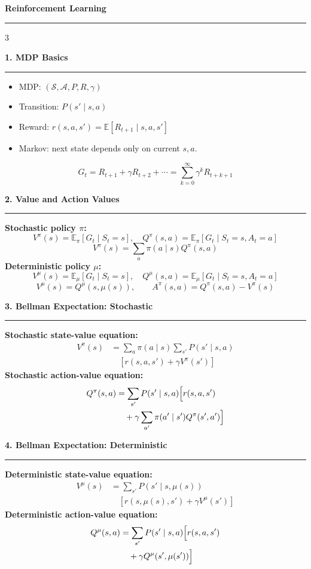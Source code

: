 \documentclass[a4paper]{article}
\newcommand{\sect}[1]{\vspace{2pt}\noindent\textbf{\large #1}\par\hrule\vspace{2pt}}
\newcommand{\tightitem}{\setlength{\itemsep}{0pt}\setlength{\parskip}{0pt}\setlength{\parsep}{0pt}}
\begin{document}
{\fontsize{26}{28}\selectfont\bfseries Reinforcement Learning}

\vspace{2mm}\hrule\vspace{3mm}

\begin{multicols*}{3}
\fontsize{9.7}{11}\selectfont

\sect{1. MDP Basics}
\begin{itemize}\tightitem
\item MDP: $(\mathcal S,\mathcal A,P,R,\gamma)$
\item Transition: $P(s'\mid s,a)$
\item Reward: $r(s,a,s')=\mathbb E[R_{t+1}\mid s,a,s']$
\item Markov: next state depends only on current $s,a$.
\end{itemize}
\[
G_t=R_{t+1}+\gamma R_{t+2}+\cdots
=\sum_{k=0}^{\infty}\gamma^kR_{t+k+1}
\]

\sect{2. Value and Action Values}
\textbf{Stochastic policy $\pi$:}
\[
V^\pi(s)=\mathbb E_\pi[G_t\mid S_t=s],\quad
Q^\pi(s,a)=\mathbb E_\pi[G_t\mid S_t=s,A_t=a]
\]
\[
V^\pi(s)=\sum_a\pi(a\mid s)Q^\pi(s,a)
\]
\textbf{Deterministic policy $\mu$:}
\[
V^\mu(s)=\mathbb E_\mu[G_t\mid S_t=s],\quad
Q^\mu(s,a)=\mathbb E_\mu[G_t\mid S_t=s,A_t=a]
\]
\[
V^\mu(s)=Q^\mu(s,\mu(s)),\qquad
A^\pi(s,a)=Q^\pi(s,a)-V^\pi(s)
\]

\sect{3. Bellman Expectation: Stochastic}
\textbf{Stochastic state-value equation:}
\[
\begin{aligned}
V^\pi(s)
&=\sum_a\pi(a\mid s)\sum_{s'}P(s'\mid s,a)\\
&\quad [r(s,a,s')+\gamma V^\pi(s')]
\end{aligned}
\]
\textbf{Stochastic action-value equation:}
\[
\begin{aligned}
Q^\pi(s,a)
&=\sum_{s'}P(s'\mid s,a)\Bigl[r(s,a,s')\\
&\quad+\gamma\sum_{a'}\pi(a'\mid s')Q^\pi(s',a')\Bigr]
\end{aligned}
\]

\sect{4. Bellman Expectation: Deterministic}
\textbf{Deterministic state-value equation:}
\[
\begin{aligned}
V^\mu(s)
&=\sum_{s'}P(s'\mid s,\mu(s))\\
&\quad [r(s,\mu(s),s')+\gamma V^\mu(s')]
\end{aligned}
\]
\textbf{Deterministic action-value equation:}
\[
\begin{aligned}
Q^\mu(s,a)
&=\sum_{s'}P(s'\mid s,a)\Bigl[r(s,a,s')\\
&\quad+\gamma Q^\mu(s',\mu(s'))\Bigr]
\end{aligned}
\]


\end{multicols*}
\end{document}
